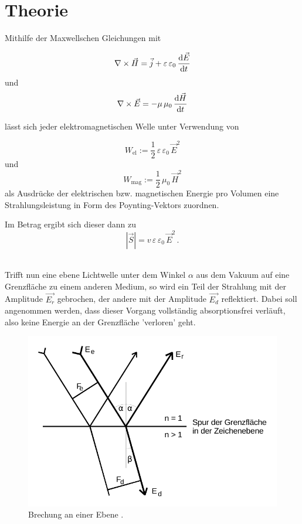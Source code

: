 \section{Theorie}
\label{sec:Theorie}

Mithilfe der Maxwellschen Gleichungen mit

\begin{equation}
    \label{eq:maxwell4}
    \nabla \times \vec{H} = \vec{j} + \varepsilon \, \varepsilon_0 \, \dfrac{\mathrm{d} \vec{E}}{\mathrm{d} t} 
\end{equation}
und
\begin{equation}
    \label{eq:maxwell2}
    \nabla \times \vec{E} = - \mu \, \mu_0 \, \frac{\mathrm{d} \vec{H}}{\mathrm{d} t} 
\end{equation}

lässt sich jeder elektromagnetischen Welle unter Verwendung von

\begin{equation}
    W_{\text{el}} := \frac{1}{2} \, \varepsilon \, \varepsilon_0 \, \vec{E}^2
\end{equation}
und
\begin{equation}
    W_{\text{mag}} := \frac{1}{2} \, \mu_0 \, \vec{H}^2
\end{equation}
als Ausdrücke der elektrischen bzw. magnetischen Energie pro Volumen eine Strahlungsleistung in Form des Poynting-Vektors zuordnen. 

Im Betrag ergibt sich dieser dann zu
\begin{equation}
    \left| \vec{S} \right|  = v \, \varepsilon \, \varepsilon_0 \, \vec{E}^2 \,.
    \label{eq:betragpoynting}
\end{equation} \\

\newpage

Trifft nun eine ebene Lichtwelle unter dem Winkel $\alpha$ aus dem Vakuum auf eine Grenzfläche zu einem anderen Medium, 
so wird ein Teil der Strahlung mit der Amplitude $\vec{E_r}$ gebrochen, der andere mit der Amplitude $\vec{E_d}$ reflektiert.
Dabei soll angenommen werden, dass dieser Vorgang vollständig absorptionsfrei verläuft, also keine Energie an der Grenzfläche 'verloren' geht.
\begin{figure}[H]
    \centering
    \includegraphics{Brechung an einer Ebene.pdf}
    \caption{Brechung an einer Ebene \cite{ap01}.} 
    \label{fig:abb1}
\end{figure}

